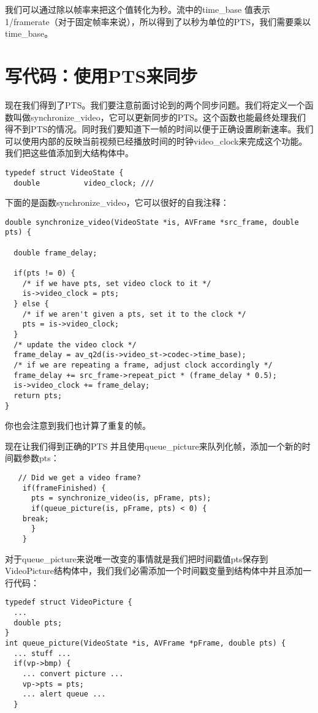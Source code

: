 我们可以通过除以帧率来把这个值转化为秒。流中的time_base 值表示1/framerate（对于固定帧率来说），所以得到了以秒为单位的PTS，我们需要乘以time_base。

\section{写代码：使用PTS来同步}

现在我们得到了PTS。我们要注意前面讨论到的两个同步问题。我们将定义一个函数叫做synchronize_video，它可以更新同步的PTS。这个函数也能最终处理我们得不到PTS的情况。同时我们要知道下一帧的时间以便于正确设置刷新速率。我们可以使用内部的反映当前视频已经播放时间的时钟video_clock来完成这个功能。我们把这些值添加到大结构体中。

 \begin{lstlisting}
typedef struct VideoState {
  double          video_clock; ///
\end{lstlisting}

下面的是函数synchronize_video，它可以很好的自我注释：

\begin{lstlisting}
double synchronize_video(VideoState *is, AVFrame *src_frame, double pts) {

  double frame_delay;

  if(pts != 0) {
    /* if we have pts, set video clock to it */
    is->video_clock = pts;
  } else {
    /* if we aren't given a pts, set it to the clock */
    pts = is->video_clock;
  }
  /* update the video clock */
  frame_delay = av_q2d(is->video_st->codec->time_base);
  /* if we are repeating a frame, adjust clock accordingly */
  frame_delay += src_frame->repeat_pict * (frame_delay * 0.5);
  is->video_clock += frame_delay;
  return pts;
}
\end{lstlisting}

你也会注意到我们也计算了重复的帧。

现在让我们得到正确的PTS 并且使用queue_picture来队列化帧，添加一个新的时间戳参数pts：

\begin{lstlisting}
   // Did we get a video frame?
    if(frameFinished) {
      pts = synchronize_video(is, pFrame, pts);
      if(queue_picture(is, pFrame, pts) < 0) {
    break;
      }
    }
\end{lstlisting}

对于queue_picture来说唯一改变的事情就是我们把时间戳值pts保存到VideoPicture结构体中，我们我们必需添加一个时间戳变量到结构体中并且添加一行代码：

\begin{lstlisting}
typedef struct VideoPicture {
  ...
  double pts;
}
int queue_picture(VideoState *is, AVFrame *pFrame, double pts) {
  ... stuff ...
  if(vp->bmp) {
    ... convert picture ...
    vp->pts = pts;
    ... alert queue ...
  }
\end{lstlisting}

